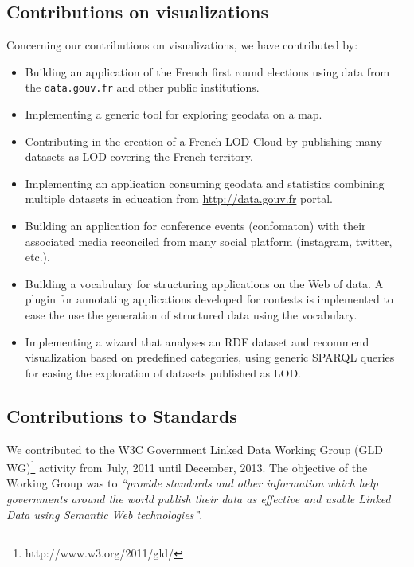 \subsection{Contributions on visualizations}
Concerning our contributions on visualizations, we have contributed by:
\begin{itemize}
\item Building an application of the French first round elections using data from the \texttt{data.gouv.fr} and other public institutions.
\item Implementing a generic tool for exploring geodata on a map.
\item Contributing in the creation of a French LOD Cloud by publishing many datasets as LOD covering the French territory. 
\item Implementing an application consuming geodata and statistics combining multiple datasets in education from \url{http://data.gouv.fr} portal.
\item Building an application for conference events (confomaton) with their associated media reconciled from many social platform (instagram, twitter, etc.).
\item Building a vocabulary for structuring applications on the Web of data. A plugin for annotating applications developed for contests is implemented to ease the use the generation of structured data using the vocabulary. 
\item Implementing a wizard that analyses an RDF dataset and recommend visualization based on predefined categories, using generic SPARQL queries for easing the exploration of datasets published as LOD. 


\end{itemize}

\subsection{Contributions to Standards}
We contributed to the W3C Government Linked Data Working Group (GLD WG)\footnote{http://www.w3.org/2011/gld/} activity from July, 2011 until December, 2013.  The objective of the Working Group was to \textit{``provide standards and other information which help governments around the world publish their data as effective and usable Linked Data using Semantic Web technologies''}.

